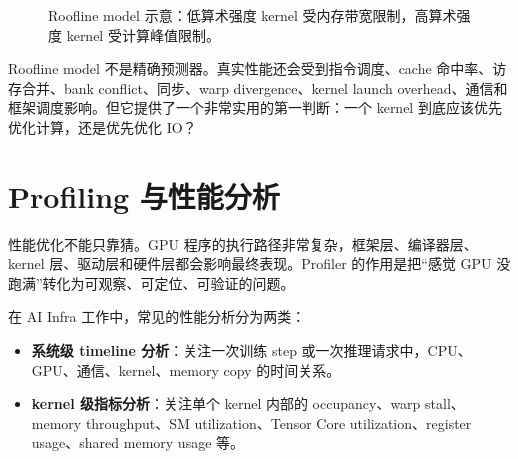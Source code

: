 \begin{figure}[H]
  \centering
  \caption{Roofline model 示意：低算术强度 kernel 受内存带宽限制，高算术强度 kernel 受计算峰值限制。}
  \label{fig:roofline-model}
\end{figure}

Roofline model 不是精确预测器。真实性能还会受到指令调度、cache 命中率、访存合并、bank conflict、同步、warp divergence、kernel launch overhead、通信和框架调度影响。但它提供了一个非常实用的第一判断：一个 kernel 到底应该优先优化计算，还是优先优化 IO？

\section{Profiling 与性能分析}
\label{sec:profiling-performance}

性能优化不能只靠猜。GPU 程序的执行路径非常复杂，框架层、编译器层、kernel 层、驱动层和硬件层都会影响最终表现。Profiler 的作用是把“感觉 GPU 没跑满”转化为可观察、可定位、可验证的问题。

在 AI Infra 工作中，常见的性能分析分为两类：

\begin{itemize}
  \item \textbf{系统级 timeline 分析}：关注一次训练 step 或一次推理请求中，CPU、GPU、通信、kernel、memory copy 的时间关系。
  \item \textbf{kernel 级指标分析}：关注单个 kernel 内部的 occupancy、warp stall、memory throughput、SM utilization、Tensor Core utilization、register usage、shared memory usage 等。
\end{itemize}

